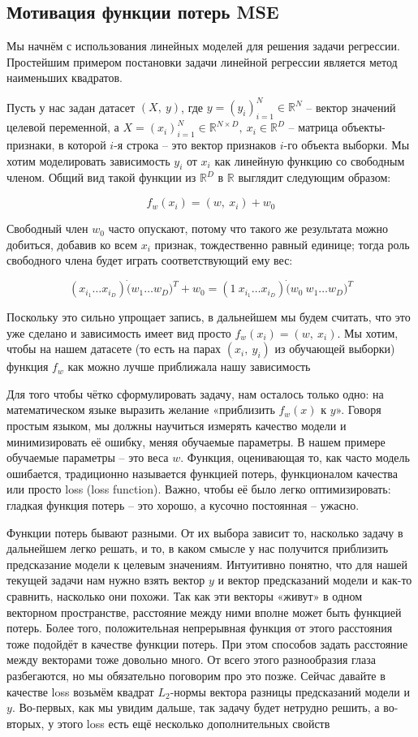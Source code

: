\subsection{Мотивация функции потерь MSE}

Мы начнём с использования линейных моделей для решения задачи регрессии.
Простейшим примером постановки задачи линейной регрессии является метод наименьших квадратов.

Пусть у нас задан датасет $(X,~y)$, где $y = (y_i)_{i=1}^N \in \mathbb{R}^N$ -- вектор значений целевой переменной,
а $X = (x_i)_{i=1}^N \in \mathbb{R}^{N \times D},~x_i \in  \mathbb{R}^D$ -- матрица объекты-признаки, в которой $i$-я строка --
это вектор признаков $i$-го объекта выборки.
Мы хотим моделировать зависимость $y_i$ от $x_i$ как линейную функцию со свободным членом.
Общий вид такой функции из $\mathbb{R}^D$ в $\mathbb{R}$ выглядит следующим образом:

\[ f_w(x_i) = (w,~x_i) + w_0 \]

Свободный член $w_0$ часто опускают, потому что такого же результата можно добиться, добавив ко всем $x_i$ признак,
тождественно равный единице; тогда роль свободного члена будет играть соответствующий ему вес:

\[(x_{i_1} \dots x_{i_D}) \dot (w_1 \dots w_D)^T + w_ 0 =(1~x_{i_1} \dots x_{i_D}) \dot (w_0~w_1 \dots w_D)^T\]

Поскольку это сильно упрощает запись, в дальнейшем мы будем считать, что это уже сделано и зависимость имеет вид
просто $f_w(x_i) = (w,~x_i)$.
Мы хотим, чтобы на нашем датасете (то есть на парах $(x_i,~y_i)$ из обучающей выборки) функция $f_w$ как можно
лучше приближала нашу зависимость

Для того чтобы чётко сформулировать задачу, нам осталось только одно: на математическом языке выразить желание
«приблизить $f_w(x)$ к $y$».
Говоря простым языком, мы должны научиться измерять качество модели и минимизировать её ошибку, меняя обучаемые
параметры.
В нашем примере обучаемые параметры -- это веса $w$.
Функция, оценивающая то, как часто модель ошибается, традиционно называется функцией потерь, функционалом
качества или просто loss (loss function).
Важно, чтобы её было легко оптимизировать: гладкая функция потерь -- это хорошо, а кусочно постоянная -- ужасно.

Функции потерь бывают разными.
От их выбора зависит то, насколько задачу в дальнейшем легко решать, и то, в каком смысле у нас получится
приблизить предсказание модели к целевым значениям.
Интуитивно понятно, что для нашей текущей задачи нам нужно взять вектор $y$ и вектор предсказаний модели и
как-то сравнить, насколько они похожи.
Так как эти векторы «живут» в одном векторном пространстве, расстояние между ними вполне может быть функцией потерь.
Более того, положительная непрерывная функция от этого расстояния тоже подойдёт в качестве функции потерь.
При этом способов задать расстояние между векторами тоже довольно много.
От всего этого разнообразия глаза разбегаются, но мы обязательно поговорим про это позже.
Сейчас давайте в качестве loss возьмём квадрат $L_2$-нормы вектора разницы предсказаний модели и $y$.
Во-первых, как мы увидим дальше, так задачу будет нетрудно решить, а во-вторых, у этого loss есть ещё несколько
дополнительных свойств

